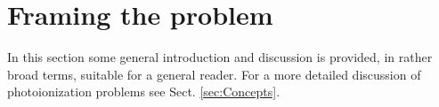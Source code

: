 \documentclass[10pt]{article}
\begin{document}




\section{Framing the problem\label{sec:Framing}}

In this section some general introduction and discussion is provided, in rather broad terms, suitable for a general reader. For a more detailed discussion of photoionization problems see Sect. \ref{sec:Concepts}.
\end{document}
